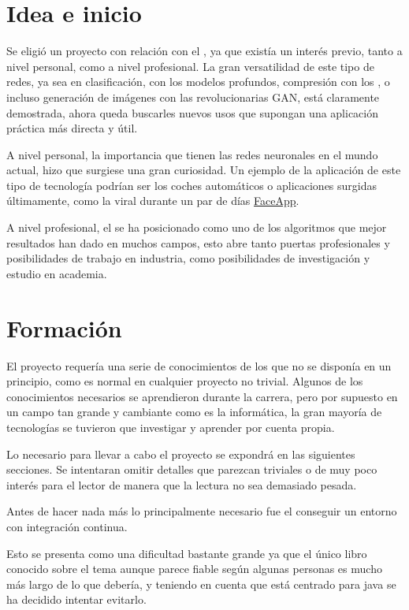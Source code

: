 
\section{Idea e inicio}

Se eligió un proyecto con relación con el , ya que existía un interés previo, tanto a nivel personal, como a nivel profesional. La gran versatilidad de este tipo de redes, ya sea en clasificación, con los modelos profundos, compresión con los , o incluso generación de imágenes con las revolucionarias GAN, está claramente demostrada, ahora queda buscarles nuevos usos que supongan una aplicación práctica más directa y útil. 

A nivel personal, la importancia que tienen las redes neuronales en el mundo actual, hizo que surgiese una gran curiosidad. Un ejemplo de la aplicación de este tipo de tecnología podrían ser los coches automáticos o aplicaciones surgidas últimamente, como la viral durante un par de días \href{https://www.faceapp.com/}{FaceApp}. 

A nivel profesional, el  se ha posicionado como uno de los algoritmos que mejor resultados han dado en muchos campos, esto abre tanto puertas profesionales y posibilidades de trabajo en industria, como posibilidades de investigación y estudio en academia. 



\section{Formación}
El proyecto requería una serie de conocimientos de los que no se disponía en un principio, como es normal en cualquier proyecto no trivial. Algunos de los conocimientos necesarios se aprendieron durante la carrera, pero por supuesto en un campo tan grande y cambiante como es la informática, la gran mayoría de tecnologías se tuvieron que investigar y aprender por cuenta propia.

Lo necesario para llevar a cabo el proyecto se expondrá en las siguientes secciones. Se intentaran omitir detalles que parezcan triviales o de muy poco interés para el lector de manera que la lectura no sea demasiado pesada.

Antes de hacer nada más lo principalmente necesario fue el conseguir un entorno con integración continua. 

Esto se presenta como una dificultad bastante grande ya que el único libro conocido sobre el tema \cite{cont07} aunque parece fiable según algunas personas es mucho más largo de lo que debería, y teniendo en cuenta que está centrado para java se ha decidido intentar evitarlo.

